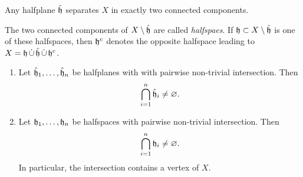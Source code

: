 \begin{thm}[Separation]
  Any halfplane \(\mathfrak{\hat h}\) separates \(X\) in exactly two connected components.
\end{thm}

\begin{defin}
  The two connected components of \(X \setminus \mathfrak{\hat h}\) are called \emph{halfspaes}. If \(\mathfrak{h} \subset X \setminus \mathfrak{\hat h}\) is one of these halfspaces, then \(\mathfrak{h}^c\) denotes the opposite halfspace leading to \(X = \mathfrak{h}\, \dot \cup\, \mathfrak{\hat h}\, \dot \cup\, \mathfrak{h}^c \).
\end{defin}

\begin{thm}[Intersection]
  \begin{enumerate}
  \item Let \(\mathfrak{\hat h}_1, \dots, \mathfrak{\hat h}_n\) be halfplanes with with pairwise non-trivial intersection. Then
    \begin{align*}
      \bigcap_{i=1}^n \mathfrak{\hat h}_i \neq \varnothing.
    \end{align*}
  \item Let \(\mathfrak{h}_1, \dots, \mathfrak{h}_n\) be halfspaces with pairwise non-trivial intersection. Then
    \begin{align*}
      \bigcap_{i=1}^n \mathfrak{h}_i \neq \varnothing.
    \end{align*}
    In particular, the intersection contains a vertex of \(X\).
  \end{enumerate}
\end{thm}

